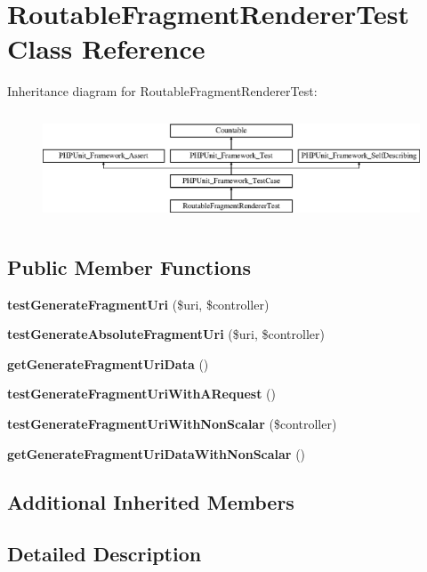 \section{Routable\+Fragment\+Renderer\+Test Class Reference}
\label{class_symfony_1_1_component_1_1_http_kernel_1_1_tests_1_1_fragment_1_1_routable_fragment_renderer_test}
Inheritance diagram for Routable\+Fragment\+Renderer\+Test\+:\begin{figure}[H]
\begin{center}
\leavevmode
\includegraphics[height=3.303835cm]{class_symfony_1_1_component_1_1_http_kernel_1_1_tests_1_1_fragment_1_1_routable_fragment_renderer_test}
\end{center}
\end{figure}
\subsection*{Public Member Functions}
\begin{DoxyCompactItemize}
\item 
{\bf test\+Generate\+Fragment\+Uri} (\$uri, \$controller)
\item 
{\bf test\+Generate\+Absolute\+Fragment\+Uri} (\$uri, \$controller)
\item 
{\bf get\+Generate\+Fragment\+Uri\+Data} ()
\item 
{\bf test\+Generate\+Fragment\+Uri\+With\+A\+Request} ()
\item 
{\bf test\+Generate\+Fragment\+Uri\+With\+Non\+Scalar} (\$controller)
\item 
{\bf get\+Generate\+Fragment\+Uri\+Data\+With\+Non\+Scalar} ()
\end{DoxyCompactItemize}
\subsection*{Additional Inherited Members}


\subsection{Detailed Description}


